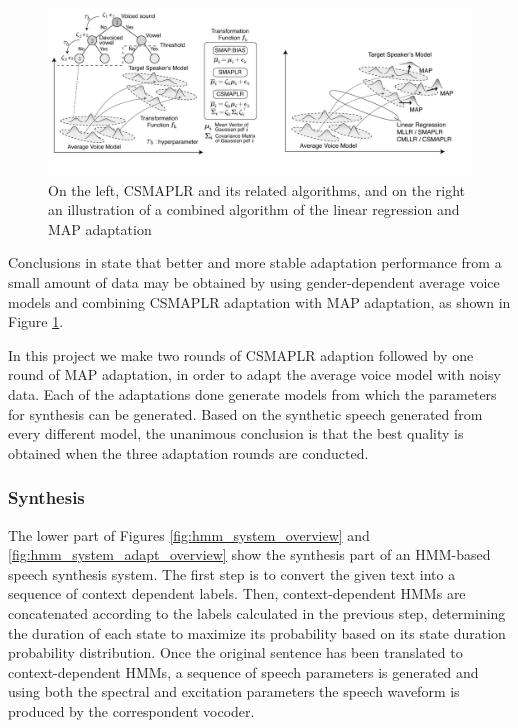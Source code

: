 \begin{figure}[!htb]
\begin{centering}
\includegraphics[width=\textwidth]{images/csmaplr_map.jpg}
\caption{On the left, CSMAPLR and its related algorithms, and on the right an illustration of a combined algorithm of the linear regression and MAP adaptation}
\label{fig:csmaplr_map}
\end{centering}
\end{figure}

Conclusions in \cite{yamagishi2009} state that better and more stable adaptation performance from a small amount of data may be obtained by using gender-dependent average voice models and combining CSMAPLR adaptation with MAP adaptation, as shown in Figure \ref{fig:csmaplr_map}.

In this project we make two rounds of CSMAPLR adaption followed by one round of MAP adaptation, in order to adapt the average voice model with noisy data.
%
Each of the adaptations done generate models from which the parameters for synthesis can be generated.
%
Based on the synthetic speech generated from every different model, the unanimous conclusion is that the best quality is obtained when the three adaptation rounds are conducted. 

\subsubsection{Synthesis}
\label{hmm_synthesis_synthesis}
The lower part of Figures \ref{fig:hmm_system_overview} and \ref{fig:hmm_system_adapt_overview} show the synthesis part of an HMM-based speech synthesis system.
%
The first step is to convert the given text into a sequence of context dependent labels.
%
Then, context-dependent HMMs are concatenated according to the labels calculated in the previous step, determining the duration of each state to maximize its probability based on its state duration probability distribution.
%
Once the original sentence has been translated to context-dependent HMMs, a sequence of speech parameters is generated and using both the spectral and excitation parameters the speech waveform is produced by the correspondent vocoder. 
